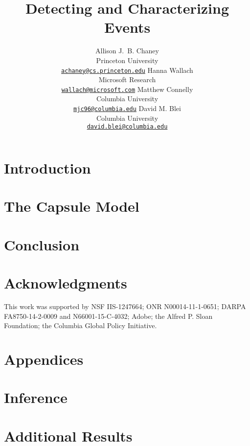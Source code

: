 \documentclass[11pt,letterpaper]{article}
\title{Detecting and Characterizing Events}
\author{
Allison J.~B. Chaney\\
    Princeton University\\
	\href{mailto:achaney@cs.princeton.edu}{\nolinkurl{achaney@cs.princeton.edu}}
\And
Hanna Wallach\\
    Microsoft Research\\
    \href{mailto:wallach@microsoft.com}{\nolinkurl{wallach@microsoft.com}}
\AND
Matthew Connelly\\
    Columbia University\\
    \href{mailto:mjc96@columbia.edu}{\nolinkurl{mjc96@columbia.edu}}
\And
David M. Blei\\
    Columbia University\\
    \href{mailto:david.blei@columbia.edu}{\nolinkurl{david.blei@columbia.edu}}
}
\date{}
\begin{document}
\maketitle

\begin{abstract}

\end{abstract}



\section{Introduction}
\label{sec:intro}


\section{The Capsule Model}
\label{sec:model}




\section{Conclusion}
\label{sec:discussion}



\section*{Acknowledgments}
This work was supported by NSF IIS-1247664; ONR N00014-11-1-0651;
DARPA FA8750-14-2-0009 and N66001-15-C-4032; Adobe; the Alfred
P. Sloan Foundation; the Columbia Global Policy Initiative.

\onecolumn
\vspace*{20px}
\section*{\Large\centering Appendices}
\vspace{50px}

\appendix
\section{Inference}
\label{sec:inference}


\section{Additional Results}
\label{sec:additional_results}


\twocolumn


\end{document}
